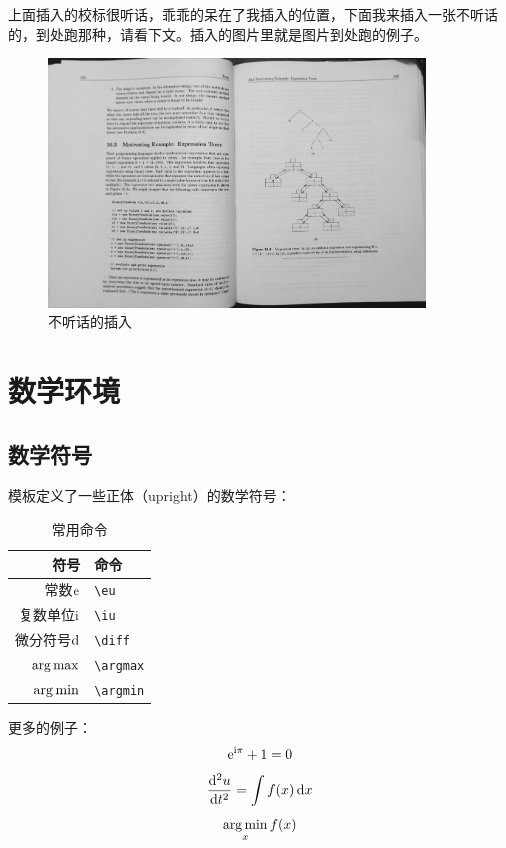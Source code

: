 上面插入的校标很听话，乖乖的呆在了我插入的位置，下面我来插入一张不听话的，到处跑那种，请看下文。插入的图片里就是图片到处跑的例子。

\begin{figure}[!h]
	\centering
	\includegraphics[origin=c,angle=90,width=10cm]{pic/sample.jpg}
	\caption{不听话的插入}
	\label{run}
\end{figure}
\section{数学环境}

\subsection{数学符号}

模板定义了一些正体（upright）的数学符号：
\begin{table}
	\centering
	\caption{常用命令}
	\label{order}
  \begin{tabular}{rl}
    \toprule
    符号                 & 命令 \\
    \midrule
    常数$\mathrm{e}$     & \verb|\eu| \\
    复数单位$\mathrm{i}$ & \verb|\iu| \\
    微分符号$\mathop{}\!\mathrm{d}$ & \verb|\diff| \\
    $\operatorname*{arg\,max}$         & \verb|\argmax| \\
    $\operatorname*{arg\,min}$         & \verb|\argmin| \\
    \bottomrule
  \end{tabular}
\end{table}

更多的例子：
\begin{equation}
\mathrm{e}^{\mathrm{i}\pi} + 1 = 0
\end{equation}
\begin{equation}
\frac{\mathop{}\!\mathrm{d}^2u}{\mathop{}\!\mathrm{d} t^2} = \int f(x) \mathop{}\!\mathrm{d} x
\end{equation}
\begin{equation}
\operatorname*{arg\,min}_x f(x)
\end{equation}

